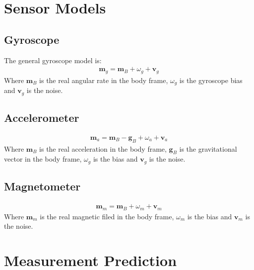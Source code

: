 \documentclass[10pt,a4paper]{article}
\newcommand{\V}[1]{\mathbf{#1}}
\begin{document}
\section{Sensor Models}

\subsection{Gyroscope}
The general gyroscope model is:
\begin{align}
  \V m_g = \V m_B + \omega_g + \V v_g
\end{align}
Where $\V m_B$ is the real angular rate in the body frame, $\omega_g$ is the gyroscope bias and $\V v_g$ is the noise.
\subsection{Accelerometer}
\begin{align}
  \V m_a = \V m_B - \V g_B + \omega_a + \V v_a
\end{align}
Where $\V m_B$ is the real acceleration in the body frame, $\V g_B$ is the gravitational vector in the body frame, $\omega_g$ is the bias and $\V v_g$ is the noise.

\subsection{Magnetometer}
\begin{align}
  \V m_m = \V m_B + \omega_m + \V v_m
\end{align}
Where $\V m_m$ is the real magnetic filed in the body frame, $\omega_m$ is the bias and $\V v_m$ is the noise.

\section{Measurement Prediction}
\end{document}

